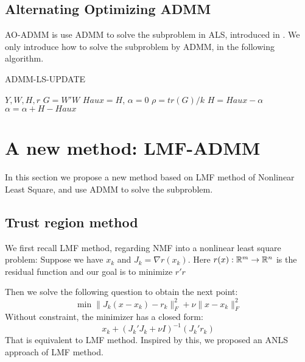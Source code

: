 \documentclass{article}
\renewcommand{\grad}{\nabla}
\begin{document}
\subsection{Alternating Optimizing ADMM}
AO-ADMM is use ADMM to solve the subproblem in ALS, introduced in \cite{aoadmm}. We only introduce how to solve the subproblem by ADMM, in the following algorithm.
\begin{algorithm}[H]
	\caption{ADMM-LS-UPDATE}
	\begin{algorithmic}[1]
		\REQUIRE $Y,W,H,r$
		\STATE $G = W'W$
		\STATE $Haux = H$, $\alpha = 0$
		\STATE $\rho = tr(G)/k$
		\STATE $H= Haux - \alpha$
		\STATE $\alpha = \alpha + H - Haux$
		\ENDFOR
	\end{algorithmic}
\end{algorithm}

\section{A new method: LMF-ADMM}
In this section we propose a new method based on LMF method of Nonlinear Least Square, and use ADMM to solve the subproblem.
\subsection{Trust region method}
We first recall LMF method, regarding NMF into a nonlinear least square problem: 
Suppose we have $x_k$ and $J_k = \grad r(x_k)$. Here $r(x) : \mathbb R^m \to \mathbb R^n$ is the residual function and our goal is to minimize $r'r$

Then we solve the following question to obtain the next point:
$$\min \|J_k(x-x_k) - r_k\|_F^2 + \nu \|x-x_k\|_F^2$$
Without constraint, the minimizer has a closed form:
$$ x_k + (J_k'J_k + \nu I)^{-1}(J_k'r_k)$$
That is equivalent to LMF method. Inspired by this, we proposed an ANLS approach of LMF method.
\end{document}
